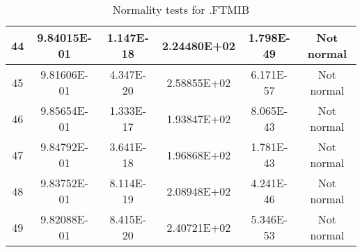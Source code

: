 \begin{table}[h]
\begin{tabular}{|c|c|c|c|c|c|}
		44 & 9.84015E-01 & 1.147E-18 & 2.24480E+02 & 1.798E-49 & Not normal\\\hline
		45 & 9.81606E-01 & 4.347E-20 & 2.58855E+02 & 6.171E-57 & Not normal\\\hline
		46 & 9.85654E-01 & 1.333E-17 & 1.93847E+02 & 8.065E-43 & Not normal\\\hline
		47 & 9.84792E-01 & 3.641E-18 & 1.96868E+02 & 1.781E-43 & Not normal\\\hline
		48 & 9.83752E-01 & 8.114E-19 & 2.08948E+02 & 4.241E-46 & Not normal\\\hline
		49 & 9.82088E-01 & 8.415E-20 & 2.40721E+02 & 5.346E-53 & Not normal\\\hline
	\end{tabular}
	\caption{Normality tests for .FTMIB}
\end{table}
